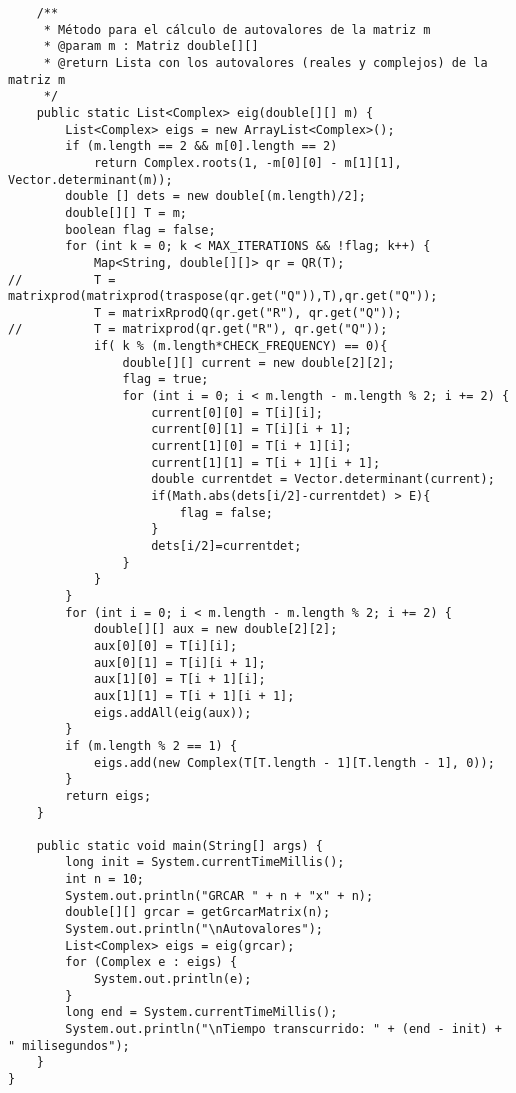 \documentclass[a4paper,10pt]{article}
\begin{document}
\begin{verbatim}
	/**
	 * Método para el cálculo de autovalores de la matriz m
	 * @param m : Matriz double[][]
	 * @return Lista con los autovalores (reales y complejos) de la matriz m
	 */
	public static List<Complex> eig(double[][] m) {
		List<Complex> eigs = new ArrayList<Complex>();
		if (m.length == 2 && m[0].length == 2)
			return Complex.roots(1, -m[0][0] - m[1][1], Vector.determinant(m));
		double [] dets = new double[(m.length)/2];
		double[][] T = m;
		boolean flag = false;
		for (int k = 0; k < MAX_ITERATIONS && !flag; k++) {
			Map<String, double[][]> qr = QR(T);
//			T = matrixprod(matrixprod(traspose(qr.get("Q")),T),qr.get("Q"));
			T = matrixRprodQ(qr.get("R"), qr.get("Q"));
//			T = matrixprod(qr.get("R"), qr.get("Q"));
			if( k % (m.length*CHECK_FREQUENCY) == 0){
				double[][] current = new double[2][2];
				flag = true;
				for (int i = 0; i < m.length - m.length % 2; i += 2) {
					current[0][0] = T[i][i];
					current[0][1] = T[i][i + 1];
					current[1][0] = T[i + 1][i];
					current[1][1] = T[i + 1][i + 1];
					double currentdet = Vector.determinant(current);
					if(Math.abs(dets[i/2]-currentdet) > E){
						flag = false;
					}
					dets[i/2]=currentdet;
				}
			}
		}
		for (int i = 0; i < m.length - m.length % 2; i += 2) {
			double[][] aux = new double[2][2];
			aux[0][0] = T[i][i];
			aux[0][1] = T[i][i + 1];
			aux[1][0] = T[i + 1][i];
			aux[1][1] = T[i + 1][i + 1];
			eigs.addAll(eig(aux));
		}
		if (m.length % 2 == 1) {
			eigs.add(new Complex(T[T.length - 1][T.length - 1], 0));
		}
		return eigs;
	}

	public static void main(String[] args) {
		long init = System.currentTimeMillis();
		int n = 10;
		System.out.println("GRCAR " + n + "x" + n);
		double[][] grcar = getGrcarMatrix(n);
		System.out.println("\nAutovalores");
		List<Complex> eigs = eig(grcar);
		for (Complex e : eigs) {
			System.out.println(e);
		}
		long end = System.currentTimeMillis();
		System.out.println("\nTiempo transcurrido: " + (end - init) + " milisegundos");
	}
}

\end{verbatim}
\end{document}
